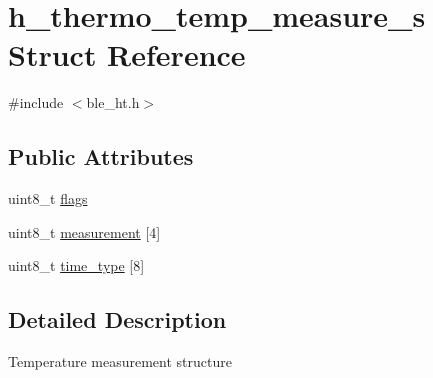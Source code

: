 \hypertarget{structh__thermo__temp__measure__s}{\section{h\-\_\-thermo\-\_\-temp\-\_\-measure\-\_\-s Struct Reference}
\label{structh__thermo__temp__measure__s}
}


{\ttfamily \#include $<$ble\-\_\-ht.\-h$>$}

\subsection*{Public Attributes}
\begin{DoxyCompactItemize}
\item 
uint8\-\_\-t \hyperlink{structh__thermo__temp__measure__s_a7f97533e88c97363a67d7e5239d9583d}{flags}
\item 
uint8\-\_\-t \hyperlink{structh__thermo__temp__measure__s_a5e89c0b96d36798f0119b2908a86cd2c}{measurement} \mbox{[}4\mbox{]}
\item 
uint8\-\_\-t \hyperlink{structh__thermo__temp__measure__s_a3614fbf11311510c4e65bca11b6033dd}{time\-\_\-type} \mbox{[}8\mbox{]}
\end{DoxyCompactItemize}


\subsection{Detailed Description}
Temperature measurement structure 

